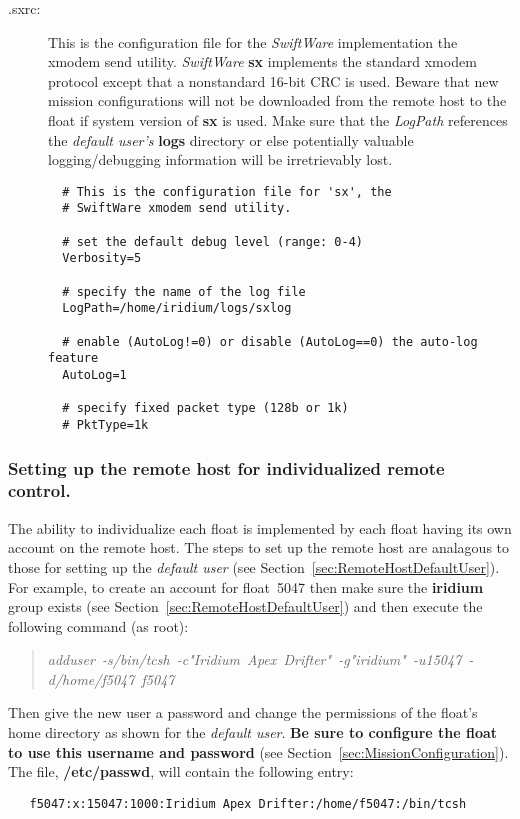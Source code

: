 \begin{description}
\item[.sxrc:] This is the configuration file for the \emph{SwiftWare}\/
  implementation the xmodem send utility.  \emph{SwiftWare}\/ \textbf{sx}
  implements the standard xmodem protocol except that a nonstandard 16-bit
  CRC is used.  Beware that new mission configurations will not be
  downloaded from the remote host to the float if system version of
  \textbf{sx} is used.  Make sure that the {\sl LogPath}\/ references the
  \emph{default user's}\/ \textbf{logs} directory or else potentially
  valuable logging/debugging information will be irretrievably lost.

  \begin{verbatim}
  # This is the configuration file for 'sx', the 
  # SwiftWare xmodem send utility.
  
  # set the default debug level (range: 0-4)
  Verbosity=5
  
  # specify the name of the log file
  LogPath=/home/iridium/logs/sxlog
  
  # enable (AutoLog!=0) or disable (AutoLog==0) the auto-log feature
  AutoLog=1
  
  # specify fixed packet type (128b or 1k)
  # PktType=1k
  \end{verbatim}

\end{description}

\subsubsection{Setting up the remote host for individualized remote control.}
\label{sec:RemoteHostUser} 

The ability to individualize each float is implemented by each float having
its own account on the remote host.  The steps to set up the remote host are
analagous to those for setting up the \emph{default user}\/ (see
Section~\ref{sec:RemoteHostDefaultUser}).  For example, to create an account
for float~5047 then make sure the \textbf{iridium} group exists (see
Section~\ref{sec:RemoteHostDefaultUser}) and then execute the following
command (as root):
\begin{quotation}
  \mbox{\sl adduser~-s/bin/tcsh~-c"Iridium~Apex~Drifter"~-g"iridium"~-u15047~-d/home/f5047~f5047}
\end{quotation}
Then give the new user a password and change the permissions of the float's
home directory as shown for the \emph{default user}.  \textbf{Be sure to
  configure the float to use this username and password} (see
Section~\ref{sec:MissionConfiguration}).  The file, \textbf{/etc/passwd},
will contain the following entry:
\begin{verbatim}
   f5047:x:15047:1000:Iridium Apex Drifter:/home/f5047:/bin/tcsh
\end{verbatim}

